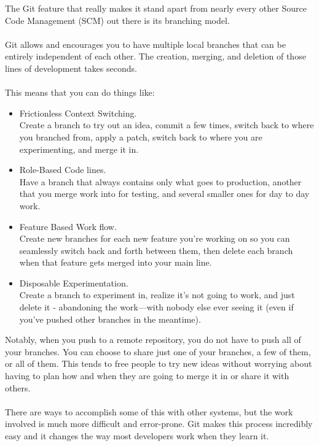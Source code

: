 The Git feature that really makes it stand apart from nearly every
other Source Code Management (SCM) out there is its branching model.\\
\\
Git allows and encourages you to have multiple local branches that can
be entirely independent of each other. The creation, merging, and
deletion of those lines of development takes seconds.\\ \\
This means that you can do things like:
\begin{itemize}
\item Frictionless Context Switching.\\ Create a branch to try out an
idea, commit a few times, switch back to where you branched from,
apply a patch, switch back to where you are experimenting, and merge
it in.
\item Role-Based Code lines. \\ Have a branch that always contains only
what goes to production, another that you merge work into for testing,
and several smaller ones for day to day work.
\item Feature Based Work flow. \\ Create new branches for each new
feature you're working on so you can seamlessly switch back and forth
between them, then delete each branch when that feature gets merged
into your main line.
\item Disposable Experimentation.\\  Create a branch to experiment in,
realize it's not going to work, and just delete it - abandoning the
work—with nobody else ever seeing it (even if you've pushed other
branches in the meantime).
\end{itemize}
Notably, when you push to a remote repository, you do not have to push
all of your branches. You can choose to share just one of your
branches, a few of them, or all of them. This tends to free people to
try new ideas without worrying about having to plan how and when they
are going to merge it in or share it with others.\\ \\
There are ways to accomplish some of this with other systems, but the
work involved is much more difficult and error-prone. Git makes this
process incredibly easy and it changes the way most developers work
when they learn it.

